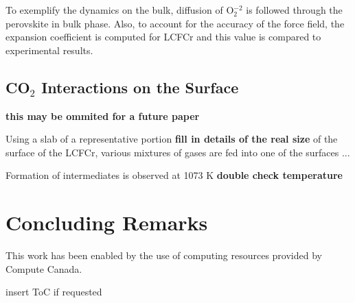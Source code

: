 \documentclass[journal=jpcafh,manuscript=article]{achemso}
\begin{document}
To exemplify the dynamics on the bulk, diffusion of O$_2^{-2}$ is followed through the perovskite in bulk phase.
Also, to account for the accuracy of the force field, the expansion coefficient is computed for LCFCr and this value is compared to experimental results.

\subsection{CO$_2$ Interactions on the Surface}

\textbf{this may be ommited for a future paper}

Using a slab of a representative portion \textbf{fill in details of the real size} of the surface of the LCFCr, various mixtures of gases are fed into one of the surfaces ...

Formation of intermediates is observed at 1073 K \textbf{double check temperature}

\section{Concluding Remarks}
\label{sec:conclusions}


\begin{acknowledgement}
This work has been enabled by the use of computing resources provided by Compute Canada.
\end{acknowledgement}

\pagebreak



\pagebreak
\begin{tocentry}
\begin{center}
insert ToC if requested
\end{center}
\end{tocentry}
\end{document}
